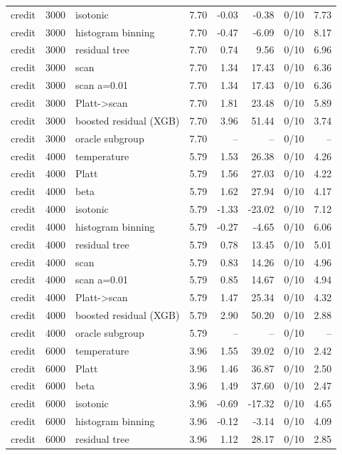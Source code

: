 \begin{tabular}{lllrrrlr}
credit & 3000 & isotonic & 7.70 & -0.03 & -0.38 & 0/10 & 7.73 \\
credit & 3000 & histogram binning & 7.70 & -0.47 & -6.09 & 0/10 & 8.17 \\
credit & 3000 & residual tree & 7.70 & 0.74 & 9.56 & 0/10 & 6.96 \\
credit & 3000 & scan & 7.70 & 1.34 & 17.43 & 0/10 & 6.36 \\
credit & 3000 & scan a=0.01 & 7.70 & 1.34 & 17.43 & 0/10 & 6.36 \\
credit & 3000 & Platt->scan & 7.70 & 1.81 & 23.48 & 0/10 & 5.89 \\
credit & 3000 & boosted residual (XGB) & 7.70 & 3.96 & 51.44 & 0/10 & 3.74 \\
credit & 3000 & oracle subgroup & 7.70 & -- & -- & 0/10 & -- \\
credit & 4000 & temperature & 5.79 & 1.53 & 26.38 & 0/10 & 4.26 \\
credit & 4000 & Platt & 5.79 & 1.56 & 27.03 & 0/10 & 4.22 \\
credit & 4000 & beta & 5.79 & 1.62 & 27.94 & 0/10 & 4.17 \\
credit & 4000 & isotonic & 5.79 & -1.33 & -23.02 & 0/10 & 7.12 \\
credit & 4000 & histogram binning & 5.79 & -0.27 & -4.65 & 0/10 & 6.06 \\
credit & 4000 & residual tree & 5.79 & 0.78 & 13.45 & 0/10 & 5.01 \\
credit & 4000 & scan & 5.79 & 0.83 & 14.26 & 0/10 & 4.96 \\
credit & 4000 & scan a=0.01 & 5.79 & 0.85 & 14.67 & 0/10 & 4.94 \\
credit & 4000 & Platt->scan & 5.79 & 1.47 & 25.34 & 0/10 & 4.32 \\
credit & 4000 & boosted residual (XGB) & 5.79 & 2.90 & 50.20 & 0/10 & 2.88 \\
credit & 4000 & oracle subgroup & 5.79 & -- & -- & 0/10 & -- \\
credit & 6000 & temperature & 3.96 & 1.55 & 39.02 & 0/10 & 2.42 \\
credit & 6000 & Platt & 3.96 & 1.46 & 36.87 & 0/10 & 2.50 \\
credit & 6000 & beta & 3.96 & 1.49 & 37.60 & 0/10 & 2.47 \\
credit & 6000 & isotonic & 3.96 & -0.69 & -17.32 & 0/10 & 4.65 \\
credit & 6000 & histogram binning & 3.96 & -0.12 & -3.14 & 0/10 & 4.09 \\
credit & 6000 & residual tree & 3.96 & 1.12 & 28.17 & 0/10 & 2.85 \\

\end{tabular}
